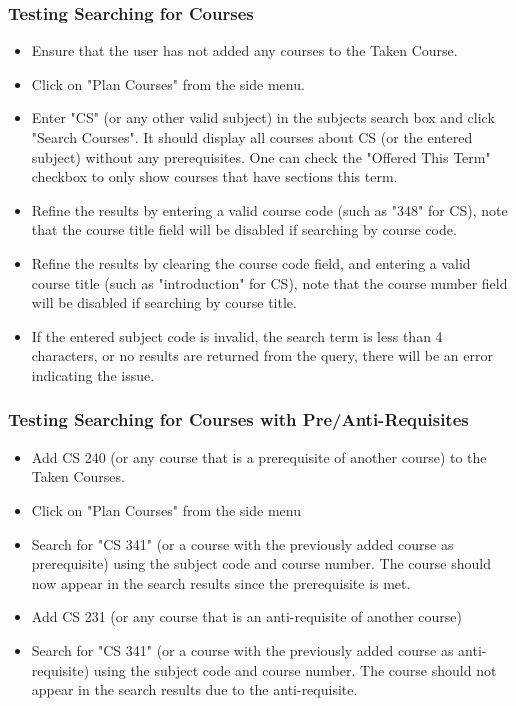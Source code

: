 \documentclass[12pt, a4paper]{article}
\begin{document}
\subsubsection*{Testing Searching for Courses}
\begin{itemize}
    \item Ensure that the user has not added any courses to the Taken Course.
    \item Click on "Plan Courses" from the side menu.
    \item Enter "CS" (or any other valid subject) in the subjects search box and click "Search Courses". It should display all courses about CS (or the entered subject) without any prerequisites. One can check the "Offered This Term" checkbox to only show courses that have sections this term.
    \item Refine the results by entering a valid course code (such as "348" for CS), note that the course title field will be disabled if searching by course code.
    \item Refine the results by clearing the course code field, and entering a valid course title (such as "introduction" for CS), note that the course number field will be disabled if searching by course title.
    \item If the entered subject code is invalid, the search term is less than 4 characters, or no results are returned from the query, there will be an error indicating the issue.
\end{itemize}
\subsubsection*{Testing Searching for Courses with Pre/Anti-Requisites}
\begin{itemize}
    \item Add CS 240 (or any course that is a prerequisite of another course) to the Taken Courses.
    \item Click on "Plan Courses" from the side menu
    \item Search for "CS 341" (or a course with the previously added course as prerequisite) using the subject code and course number. The course should now appear in the search results since the prerequisite is met.
    \item Add CS 231 (or any course that is an anti-requisite of another course)
    \item Search for "CS 341" (or a course with the previously added course as anti-requisite) using the subject code and course number. The course should not appear in the search results due to the anti-requisite.
\end{itemize}
\end{document}
